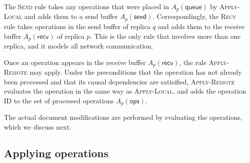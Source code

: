 \documentclass[10pt,journal,compsoc]{IEEEtran}
\begin{document}
The \textsc{Send} rule takes any operations that were placed in $A_p(\mathsf{queue})$ by \textsc{Apply-Local} and adds them to a send buffer $A_p(\mathsf{send})$. Correspondingly, the \textsc{Recv} rule takes operations in the send buffer of replica $q$ and adds them to the receive buffer $A_p(\mathsf{recv})$ of replica $p$. This is the only rule that involves more than one replica, and it models all network communication.

Once an operation appears in the receive buffer $A_p(\mathsf{recv})$, the rule \textsc{Apply-Remote} may apply. Under the preconditions that the operation has not already been processed and that its causal dependencies are satisified, \textsc{Apply-Remote} evaluates the operation in the same way as \textsc{Apply-Local}, and adds the operation ID to the set of processed operations $A_p(\mathsf{ops})$.

The actual document modifications are performed by evaluating the operations, which we discuss next.

\subsection{Applying operations}
\end{document}
